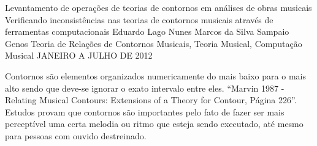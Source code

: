 \documentclass[11pt]{article}
\begin{document}
\graphicspath{{figs/}}


\dadosRelatorioFinal
{Levantamento de operações de teorias de contornos em análises de
  obras musicais}
{Verificando inconsistências nas teorias de contornos musicais através
  de ferramentas computacionais }
{Eduardo Lago Nunes}
{Marcos da Silva Sampaio}
{Genos}
{Teoria de Relações de Contornos Musicais, Teoria Musical, Computação Musical}
{JANEIRO A JULHO DE 2012}


\newpage

\setcounter{page}{1}
\onehalfspace






\label{sec:introducao}

Contornos são elementos organizados numericamente do mais baixo para
o mais alto sendo que deve-se ignorar o exato intervalo entre eles.
``Marvin 1987 - Relating Musical Contours: Extensions of a Theory for Contour,
Página 226''.
Estudos provam que contornos são importantes pelo fato de fazer ser 
mais perceptível uma certa melodia ou ritmo que esteja sendo executado, 
até mesmo para pessoas com ouvido destreinado.
\end{document}
